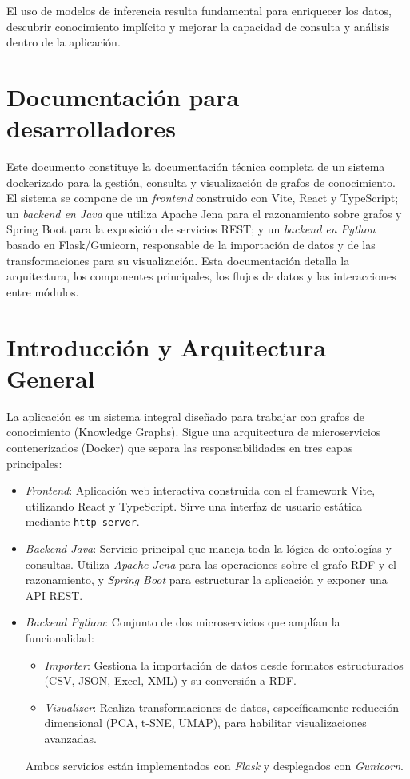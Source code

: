 \documentclass{article}
\begin{document}
El uso de modelos de inferencia resulta fundamental para enriquecer los datos, descubrir conocimiento implícito y mejorar la capacidad de consulta y análisis dentro de la aplicación.



\section{Documentación para desarrolladores}

Este documento constituye la documentación técnica completa de un sistema dockerizado para la gestión, consulta y visualización de grafos de conocimiento. El sistema se compone de un \textit{frontend} construido con Vite, React y TypeScript; un \textit{backend en Java} que utiliza Apache Jena para el razonamiento sobre grafos y Spring Boot para la exposición de servicios REST; y un \textit{backend en Python} basado en Flask/Gunicorn, responsable de la importación de datos y de las transformaciones para su visualización. Esta documentación detalla la arquitectura, los componentes principales, los flujos de datos y las interacciones entre módulos.

\section{Introducción y Arquitectura General}
La aplicación es un sistema integral diseñado para trabajar con grafos de conocimiento (Knowledge Graphs). Sigue una arquitectura de microservicios contenerizados (Docker) que separa las responsabilidades en tres capas principales:

\begin{itemize}
    \item \textit{Frontend}: Aplicación web interactiva construida con el framework Vite, utilizando React y TypeScript. Sirve una interfaz de usuario estática mediante \texttt{http-server}.
    \item \textit{Backend Java}: Servicio principal que maneja toda la lógica de ontologías y consultas. Utiliza \textit{Apache Jena} para las operaciones sobre el grafo RDF y el razonamiento, y \textit{Spring Boot} para estructurar la aplicación y exponer una API REST.
    \item \textit{Backend Python}: Conjunto de dos microservicios que amplían la funcionalidad:
    \begin{itemize}
        \item \textit{Importer}: Gestiona la importación de datos desde formatos estructurados (CSV, JSON, Excel, XML) y su conversión a RDF.
        \item \textit{Visualizer}: Realiza transformaciones de datos, específicamente reducción dimensional (PCA, t-SNE, UMAP), para habilitar visualizaciones avanzadas.
    \end{itemize}
    Ambos servicios están implementados con \textit{Flask} y desplegados con \textit{Gunicorn}.
\end{itemize}
\end{document}
